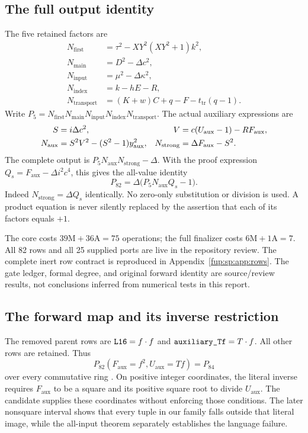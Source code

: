 \documentclass[11pt,letterpaper]{article}
\theoremstyle{definition}\newtheorem{definition}[theorem]{Definition}
\theoremstyle{remark}\newtheorem{remark}[theorem]{Remark}
\newcommand{\code}[1]{\texttt{\detokenize{#1}}}
\newcommand{\D}{\Delta}
\newcommand{\Nf}{N_{\mathrm{first}}}\newcommand{\Nm}{N_{\mathrm{main}}}\newcommand{\Ni}{N_{\mathrm{input}}}
\newcommand{\Na}{N_{\mathrm{aux}}}\newcommand{\Nk}{N_{\mathrm{index}}}\newcommand{\Nt}{N_{\mathrm{transport}}}
\newcommand{\Ns}{N_{\mathrm{strong}}}
\newcommand{\Fa}{F_{\mathrm{aux}}}\newcommand{\Ua}{U_{\mathrm{aux}}}\newcommand{\ttt}{t_{\mathrm{tr}}}
\begin{document}
\subsection{The full output identity}
The five retained factors are
\begin{align}
\Nf&=\tau^2-XY^2(XY^2+1)k^2,\label{fup:sp:eq:first}\\
\Nm&=D^2-\D c^2,\\
\Ni&=\mu^2-\D\kappa^2,\\
\Nk&=k-hE-R,\label{fup:sp:eq:index}\\
\Nt&=(K+w)C+q-F-\ttt(q-1).\label{fup:sp:eq:transport}
\end{align}
Write $P_5=\Nf\Nm\Ni\Nk\Nt$. The actual auxiliary expressions are
\begin{align}
S&=i\D c^2,&V&=c(\Ua-1)-R\Fa,\label{fup:sp:eq:aux}\\
\Na&=S^2V^2-(S^2-1)\yaux^2,&\Ns&=\D\Fa-S^2.\label{fup:sp:eq:auxnorm}
\end{align}
The complete output is $P_5\Na\Ns-\D$. With the proof expression
$Q_s=\Fa-\D i^2c^4$, this gives the all-value identity
\begin{equation}
\boxed{P_{82}=\D\bigl(P_5\Na Q_s-1\bigr).}
\label{fup:sp:eq:final}
\end{equation}
Indeed $\Ns=\D Q_s$ identically. No zero-only substitution or division
is used. A product equation is never silently replaced by the assertion
that each of its factors equals $+1$.

The core costs $39\mathrm M+36\mathrm A=75$ operations; the full
finalizer costs $6\mathrm M+1\mathrm A=7$. All 82 rows and all 25
supplied ports are live in the repository review. The complete inert
row contract is reproduced in Appendix~\ref{fup:sp:app:rows}. The gate ledger,
formal degree, and original forward identity are source/review results,
not conclusions inferred from numerical tests in this report.

\subsection{The forward map and its inverse restriction}
The removed parent rows are $\code{L16}=f\cdot f$ and
$\code{auxiliary_Tf}=T\cdot f$. All other rows are retained. Thus
\begin{equation}
P_{82}(\Fa=f^2,\Ua=Tf)=P_{84}
\label{fup:sp:eq:forward}
\end{equation}
over every commutative ring \cite{fup:sp:candidate,fup:sp:review}.
On positive integer coordinates, the literal inverse requires $\Fa$
to be a square and its positive square root to divide $\Ua$. The
candidate supplies these coordinates without enforcing those
conditions. The later nonsquare interval shows that every tuple in
our family falls outside that literal image, while the all-input
theorem separately establishes the language failure.
\end{document}
